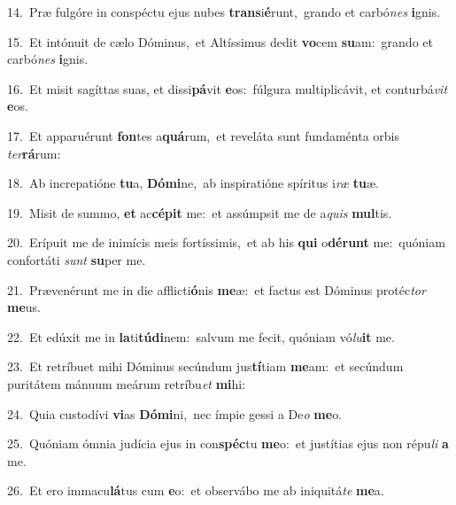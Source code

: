 {\numbfont\textcolor{\numbcolor}{14.}}~Præ fulgóre in conspéctu ejus nubes \textbf{trans}\-i\-\textbf{é}\-runt,~\star grando et carbó\textit{nes} \textbf{i}\-gnis.\par
{\numbfont\textcolor{\numbcolor}{15.}}~Et intónuit de cælo Dóminus,~\dagger et Altíssimus dedit \textbf{vo}\-cem \textbf{su}\-am:~\star grando et carbó\textit{nes} \textbf{i}\-gnis.\par
{\numbfont\textcolor{\numbcolor}{16.}}~Et misit sagíttas suas, et dissi\-\textbf{pá}\-vit \textbf{e}\-os:~\star fúlgura multiplicávit, et conturbá\textit{vit} \textbf{e}\-os.\par
{\numbfont\textcolor{\numbcolor}{17.}}~Et apparuérunt \textbf{fon}\-tes a\-\textbf{quá}\-rum,~\star et reveláta sunt fundaménta orbis \textit{ter}\-\textbf{rá}rum:\par
{\numbfont\textcolor{\numbcolor}{18.}}~Ab increpatióne \textbf{tu}\-a, \textbf{Dó}\-\textbf{mi}ne,~\star ab inspiratióne spíritus i\textit{ræ} \textbf{tu}\-æ.\par
{\numbfont\textcolor{\numbcolor}{19.}}~Misit de summo, \textbf{et} ac\-\textbf{cé}\-\textbf{pit} me:~\star et assúmpsit me de a\textit{quis} \textbf{mul}\-tis.\par
{\numbfont\textcolor{\numbcolor}{20.}}~Erípuit me de inimícis meis fortíssimis,~\dagger et ab his \textbf{qui} o\-\textbf{dé}\-\textbf{runt} me:~\star quóniam confortáti \textit{sunt} \textbf{su}\-per me.\par
{\numbfont\textcolor{\numbcolor}{21.}}~Prævenérunt me in die afflicti\-\textbf{ó}\-nis \textbf{me}\-æ:~\star et factus est Dóminus protéc\textit{tor} \textbf{me}\-us.\par
{\numbfont\textcolor{\numbcolor}{22.}}~Et edúxit me in \textbf{la}\-ti\-\textbf{tú}\-\textbf{di}nem:~\star salvum me fecit, quóniam vó\-\textit{lu}\-\textbf{it} me.\par
{\numbfont\textcolor{\numbcolor}{23.}}~Et retríbuet mihi Dóminus secúndum jus\-\textbf{tí}\-tiam \textbf{me}\-am:~\star et secúndum puritátem mánuum meárum retríbu\textit{et} \textbf{mi}\-hi:\par
{\numbfont\textcolor{\numbcolor}{24.}}~Quia custodívi \textbf{vi}\-as \textbf{Dó}\-\textbf{mi}ni,~\star nec ímpie gessi a De\textit{o} \textbf{me}\-o.\par
{\numbfont\textcolor{\numbcolor}{25.}}~Quóniam ómnia judícia ejus in con\-\textbf{spéc}\-tu \textbf{me}\-o:~\star et justítias ejus non répu\textit{li} \textbf{a} me.\par
{\numbfont\textcolor{\numbcolor}{26.}}~Et ero immacu\-\textbf{lá}\-tus cum \textbf{e}\-o:~\star et observábo me ab iniquitá\textit{te} \textbf{me}\-a.\par
